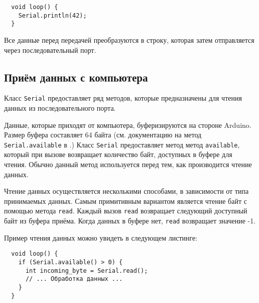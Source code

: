 \documentclass[../sparc.tex]{subfiles}
\begin{document}
\begin{verbatim}
  void loop() {
    Serial.println(42);
  }
\end{verbatim}

Все данные перед передачей преобразуются в строку, которая затем отправляется
через последовательный порт.

\subsection{Приём данных с компьютера}

Класс \texttt{Serial} предоставляет ряд методов, которые предназначены для
чтения данных из последовательного порта.

Данные, которые приходят от компьютера, буферизируются на стороне Arduino.
Размер буфера составляет 64 байта (см. документацию на метод
\texttt{Serial.available} в \cite{arduino:reference}.)  Класс \texttt{Serial}
предоставляет метод метод \texttt{available}, который при вызове возвращает
количество байт, доступных в буфере для чтения.  Обычно данный метод
используется перед тем, как производится чтение данных.

Чтение данных осуществляется несколькими способами, в зависимости от типа
принимаемых данных.  Самым примитивным вариантом является чтение байт с помощью
метода \texttt{read}.  Каждый вызов \texttt{read} возвращает следующий доступный
байт из буфера приёма.  Когда данных в буфере нет, \texttt{read} возвращает
значение -1.


Пример чтения данных можно увидеть в следующем листинге:

\begin{verbatim}
  void loop() {
    if (Serial.available() > 0) {
      int incoming_byte = Serial.read();
      // ... Обработка данных ...
    }
  }
\end{verbatim}
\end{document}
